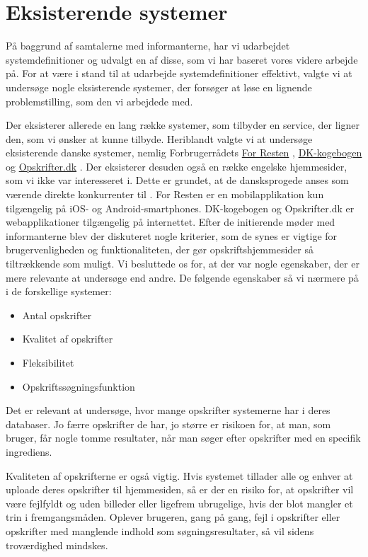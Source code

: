 \section{Eksisterende systemer}
\label{sec:eksisterendesystemer}

På baggrund af samtalerne med informanterne, har vi udarbejdet systemdefinitioner og udvalgt en af disse, som vi har baseret vores videre arbejde på. For at være i stand til at udarbejde systemdefinitioner effektivt, valgte vi at undersøge nogle eksisterende systemer, der forsøger at løse en lignende problemstilling, som den vi arbejdede med.

Der eksisterer allerede en lang række systemer, som tilbyder en service, der ligner den, som vi ønsker at kunne tilbyde. Heriblandt valgte vi at undersøge  eksisterende danske systemer, nemlig Forbrugerrådets \href{https://play.google.com/store/apps/details?id=com.nodes.forresten}{For Resten} \cite{forresten}, \href{http://dk-kogebogen.dk/}{DK-kogebogen} \cite{dkkogebogen} og \href{http://opskrifter.dk/}{Opskrifter.dk} \cite{opskrifterdk}. Der eksisterer desuden også en række engelske hjemmesider, som vi ikke var interesseret i. Dette er grundet, at de dansksprogede anses som værende direkte konkurrenter til \Foodl{}. For Resten er en mobilapplikation kun tilgængelig på iOS- og Android-smartphones. DK-kogebogen og Opskrifter.dk er webapplikationer tilgængelig på internettet. Efter de initierende møder med informanterne blev der diskuteret nogle kriterier, som de synes er vigtige for brugervenligheden og funktionaliteten, der gør opskriftshjemmesider så tiltrækkende som muligt. Vi besluttede os for, at der var nogle egenskaber, der er mere relevante at undersøge end andre. De følgende egenskaber så vi nærmere på i de forskellige systemer:

\begin{itemize}[noitemsep]
  \item Antal opskrifter
  \item Kvalitet af opskrifter
  \item Fleksibilitet
  \item Opskriftssøgningsfunktion
\end{itemize}

Det er relevant at undersøge, hvor mange opskrifter systemerne har i deres databaser. Jo færre opskrifter de har, jo større er risikoen for, at man, som bruger, får nogle tomme resultater, når man søger efter opskrifter med en specifik ingrediens. 

Kvaliteten af opskrifterne er også vigtig. Hvis systemet tillader alle og enhver at uploade deres opskrifter til hjemmesiden, så er der en risiko for, at opskrifter vil være fejlfyldt og uden billeder eller ligefrem ubrugelige, hvis der blot mangler et trin i fremgangsmåden. Oplever brugeren, gang på gang, fejl i opskrifter eller opskrifter med manglende indhold som søgningsresultater, så vil sidens troværdighed mindskes. 

